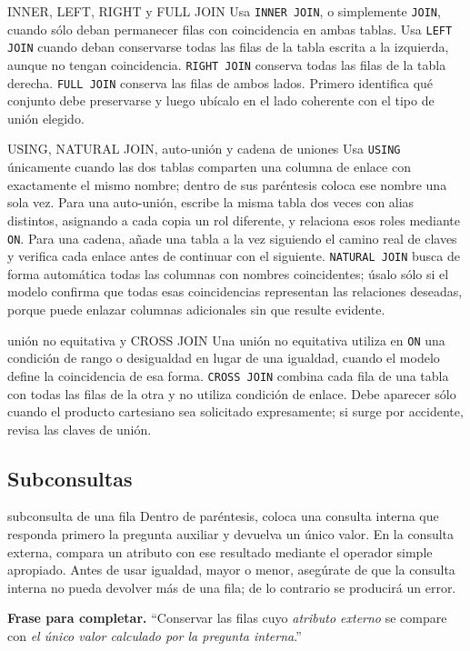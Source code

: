 \documentclass[11pt,a4paper]{article}
\newcommand{\campo}[1]{\texttt{#1}}
\begin{document}
\begin{plantilla}{INNER, LEFT, RIGHT y FULL JOIN}
Usa \campo{INNER JOIN}, o simplemente \campo{JOIN}, cuando sólo deban permanecer filas con
coincidencia en ambas tablas. Usa \campo{LEFT JOIN} cuando deban conservarse todas las filas de la
tabla escrita a la izquierda, aunque no tengan coincidencia. \campo{RIGHT JOIN} conserva todas las
filas de la tabla derecha. \campo{FULL JOIN} conserva las filas de ambos lados. Primero identifica
qué conjunto debe preservarse y luego ubícalo en el lado coherente con el tipo de unión elegido.
\end{plantilla}

\begin{plantilla}{USING, NATURAL JOIN, auto-unión y cadena de uniones}
Usa \campo{USING} únicamente cuando las dos tablas comparten una columna de enlace con exactamente el
mismo nombre; dentro de sus paréntesis coloca ese nombre una sola vez. Para una auto-unión, escribe la
misma tabla dos veces con alias distintos, asignando a cada copia un rol diferente, y relaciona esos
roles mediante \campo{ON}. Para una cadena, añade una tabla a la vez siguiendo el camino real de
claves y verifica cada enlace antes de continuar con el siguiente. \campo{NATURAL JOIN} busca de
forma automática todas las columnas con nombres coincidentes; úsalo sólo si el modelo confirma que
todas esas coincidencias representan las relaciones deseadas, porque puede enlazar columnas
adicionales sin que resulte evidente.
\end{plantilla}

\begin{plantilla}{unión no equitativa y CROSS JOIN}
Una unión no equitativa utiliza en \campo{ON} una condición de rango o desigualdad en lugar de una
igualdad, cuando el modelo define la coincidencia de esa forma. \campo{CROSS JOIN} combina cada fila
de una tabla con todas las filas de la otra y no utiliza condición de enlace. Debe aparecer sólo
cuando el producto cartesiano sea solicitado expresamente; si surge por accidente, revisa las claves
de unión.
\end{plantilla}

\subsection{Subconsultas}

\begin{plantilla}{subconsulta de una fila}
Dentro de paréntesis, coloca una consulta interna que responda primero la pregunta auxiliar y devuelva
un único valor. En la consulta externa, compara un atributo con ese resultado mediante el operador
simple apropiado. Antes de usar igualdad, mayor o menor, asegúrate de que la consulta interna no pueda
devolver más de una fila; de lo contrario se producirá un error.

\textbf{Frase para completar.} ``Conservar las filas cuyo \emph{atributo externo} se compare con
\emph{el único valor calculado por la pregunta interna}.''
\end{plantilla}
\end{document}
